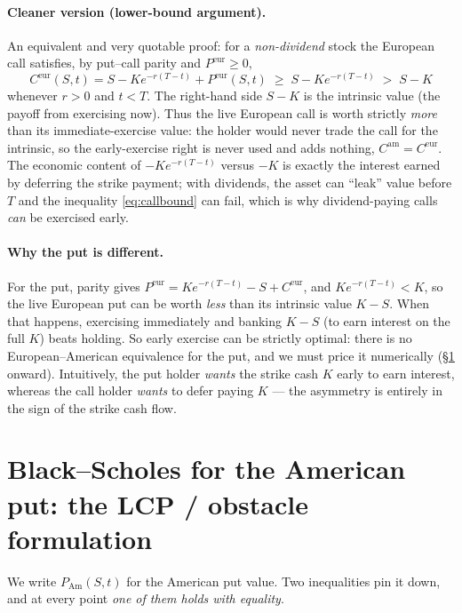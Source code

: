 \documentclass[11pt]{article}
\begin{document}
\paragraph{Cleaner version (lower-bound argument).} An equivalent and very quotable proof: for a
\emph{non-dividend} stock the European call satisfies, by put--call parity and $P^{\text{eur}}\ge0$,
\begin{equation}\label{eq:callbound}
C^{\text{eur}}(S,t)=S-Ke^{-r(T-t)}+P^{\text{eur}}(S,t)\;\ge\; S-Ke^{-r(T-t)}\;>\;S-K
\end{equation}
whenever $r>0$ and $t<T$. The right-hand side $S-K$ is the intrinsic value (the payoff from exercising now).
Thus the live European call is worth strictly \emph{more} than its immediate-exercise value: the holder would
never trade the call for the intrinsic, so the early-exercise right is never used and adds nothing,
$C^{\text{am}}=C^{\text{eur}}$. The economic content of $-Ke^{-r(T-t)}$ versus $-K$ is exactly the interest
earned by deferring the strike payment; with dividends, the asset can ``leak'' value before $T$ and the
inequality \eqref{eq:callbound} can fail, which is why dividend-paying calls \emph{can} be exercised early.

\paragraph{Why the put is different.} For the put, parity gives
$P^{\text{eur}}=Ke^{-r(T-t)}-S+C^{\text{eur}}$, and $Ke^{-r(T-t)}<K$, so the live European put can be worth
\emph{less} than its intrinsic value $K-S$. When that happens, exercising immediately and banking $K-S$ (to
earn interest on the full $K$) beats holding. So early exercise can be strictly optimal: there is no
European--American equivalence for the put, and we must price it numerically (\S\ref{sec:lcp}
onward). Intuitively, the put holder \emph{wants} the strike cash $K$ early to earn interest, whereas the call
holder \emph{wants} to defer paying $K$ --- the asymmetry is entirely in the sign of the strike cash flow.

\section{Black--Scholes for the American put: the LCP / obstacle formulation}\label{sec:lcp}

We write $P_{\mathrm{Am}}(S,t)$ for the American put value. Two inequalities pin it down, and at every point
\emph{one of them holds with equality}.
\end{document}
